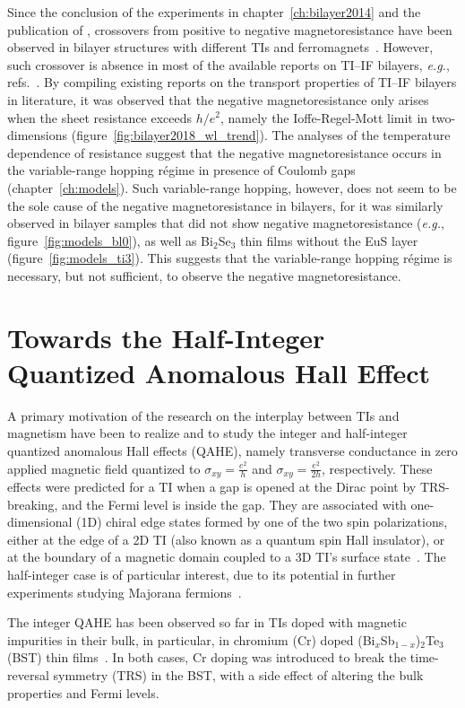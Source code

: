 Since the conclusion of the experiments in chapter~\ref{ch:bilayer2014} and the publication of \cite{bilayer2014}, crossovers from positive to negative magnetoresistance have been observed in bilayer structures with different TIs and ferromagnets~\cite{Samarth2017, Tian2016}. However, such crossover is absence in most of the available reports on TI--IF bilayers, \textit{e.g.}, refs.~\cite{Shi2014, Petta2014, Wang2014, Tian2016, Qiu2017}. By compiling existing reports on the transport properties of TI--IF bilayers in literature, it was observed that the negative magnetoresistance only arises when the sheet resistance exceeds $h / e^2$, namely the Ioffe-Regel-Mott limit in two-dimensions (figure~\ref{fig:bilayer2018_wl_trend}). The analyses of the temperature dependence of resistance suggest that the negative magnetoresistance occurs in the variable-range hopping r\'egime in presence of Coulomb gaps (chapter~\ref{ch:models}). Such variable-range hopping, however, does not seem to be the sole cause of the negative magnetoresistance in bilayers, for it was similarly observed in bilayer samples that did not show negative magnetoresistance (\textit{e.g.}, figure~\ref{fig:models_bl0}), as well as Bi$_2$Se$_3$ thin films without the EuS layer (figure~\ref{fig:models_ti3}). This suggests that the variable-range hopping r\'egime is necessary, but not sufficient, to observe the negative magnetoresistance.
%
\section{Towards the Half-Integer Quantized Anomalous Hall Effect}
A primary motivation of the research on the interplay between TIs and magnetism have been to realize and to study the integer and half-integer quantized anomalous Hall effects (QAHE), namely transverse conductance in zero applied magnetic field quantized to $\sigma_{xy} = \frac{e^2}{h}$ and $\sigma_{xy} = \frac{e^2}{2h}$, respectively. These effects were predicted for a TI when a gap is opened at the Dirac point by TRS-breaking, and the Fermi level is inside the gap. They are associated with one-dimensional (1D) chiral edge states formed by one of the two spin polarizations, either at the edge of a 2D TI (also known as a quantum spin Hall insulator), or at the boundary of a magnetic domain coupled to a 3D TI's surface state~\cite{TI_Qi, TI_Col, QAH_TI_Yu}. The half-integer case is of particular interest, due to its potential in further experiments studying Majorana fermions~\cite{Akhmerov2009}.

The integer QAHE has been observed so far in TIs doped with magnetic impurities in their bulk, in particular, in chromium (Cr) doped (Bi$_x$Sb$_{1-x}$)$_2$Te$_3$ (BST) thin films~\cite{Chang2013, Kou2014}. In both cases, Cr doping was introduced to break the time-reversal symmetry (TRS) in the BST, with a side effect of altering the bulk properties and Fermi levels.

